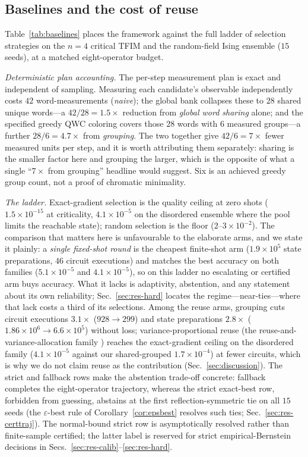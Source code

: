 \documentclass[aps,pra,reprint,superscriptaddress,nofootinbib,floatfix]{revtex4-2}
\begin{document}
\subsection{Baselines and the cost of reuse}
\label{sec:res-baselines}

Table~\ref{tab:baselines} places the framework against the full ladder of selection strategies on the $n=4$ critical TFIM and the random-field Ising ensemble ($15$ seeds), at a matched eight-operator budget.

\emph{Deterministic plan accounting.} The per-step measurement plan is exact and independent of sampling. Measuring each candidate's observable independently costs $42$ word-measurements (\emph{naive}); the global bank collapses these to $28$ shared unique words---a $42/28=1.5\times$ reduction from \emph{global word sharing} alone; and the specified greedy QWC coloring covers those $28$ words with $6$ measured groups---a further $28/6=4.7\times$ from \emph{grouping}. The two together give $42/6=7\times$ fewer measured units per step, and it is worth attributing them separately: sharing is the smaller factor here and grouping the larger, which is the opposite of what a single ``$7\times$ from grouping'' headline would suggest. Six is an achieved greedy group count, not a proof of chromatic minimality.

\emph{The ladder.} Exact-gradient selection is the quality ceiling at zero shots ($1.5\times10^{-15}$ at criticality, $4.1\times10^{-5}$ on the disordered ensemble where the pool limits the reachable state); random selection is the floor ($2$--$3\times10^{-2}$). The comparison that matters here is unfavourable to the elaborate arms, and we state it plainly: a \emph{single fixed-shot round} is the cheapest finite-shot arm ($1.9\times10^5$ state preparations, $46$ circuit executions) and matches the best accuracy on both families ($5.1\times10^{-5}$ and $4.1\times10^{-5}$), so on this ladder no escalating or certified arm buys accuracy. What it lacks is adaptivity, abstention, and any statement about its own reliability; Sec.~\ref{sec:res-hard} locates the regime---near-ties---where that lack costs a third of its selections. Among the reuse arms, grouping cuts circuit executions $3.1\times$ ($928\to299$) and state preparations $2.8\times$ ($1.86\times10^6\to6.6\times10^5$) without loss; variance-proportional reuse (the reuse-and-variance-allocation family \cite{ikhtiarudin2025shot}) reaches the exact-gradient ceiling on the disordered family ($4.1\times10^{-5}$ against our shared-grouped $1.7\times10^{-4}$) at fewer circuits, which is why we do not claim reuse as the contribution (Sec.~\ref{sec:discussion}). The strict and fallback rows make the abstention trade-off concrete: fallback completes the eight-operator trajectory, whereas the strict exact-best row, forbidden from guessing, abstains at the first reflection-symmetric tie on all $15$ seeds (the $\varepsilon$-best rule of Corollary~\ref{cor:epsbest} resolves such ties; Sec.~\ref{sec:res-certtraj}). The normal-bound strict row is asymptotically resolved rather than finite-sample certified; the latter label is reserved for strict empirical-Bernstein decisions in Secs.~\ref{sec:res-calib}--\ref{sec:res-hard}.
\end{document}
